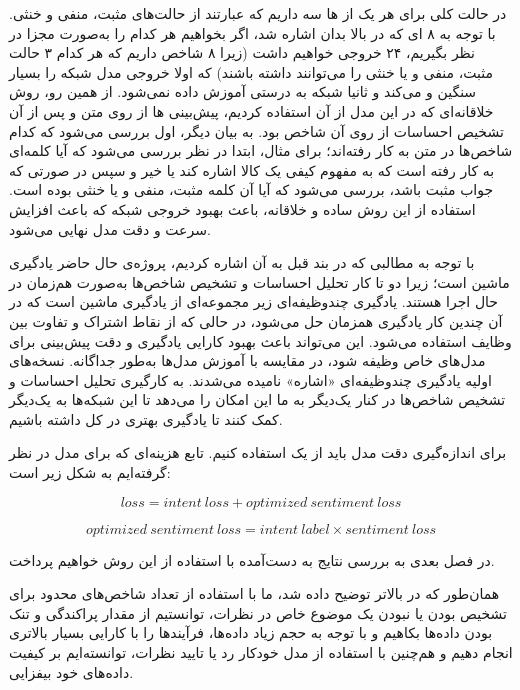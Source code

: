 در حالت کلی برای هر یک از 
ها 
سه
داریم که عبارتند از حالت‌های مثبت، منفی و خنثی. با توجه به ۸
ای که در بالا بدان اشاره شد، اگر بخواهیم هر کدام را به‌صورت مجزا در نظر بگیریم، ۲۴ خروجی خواهیم داشت (زیرا ۸ شاخص داریم که هر کدام ۳ حالت مثبت، منفی و یا خنثی را می‌توانند داشته باشند) که اولا خروجی مدل شبکه را بسیار سنگین و 
می‌کند و ثانیا شبکه به درستی آموزش داده نمی‌شود. از همین رو، روش خلاقانه‌ای که در این مدل از آن استفاده کردیم، پیش‌بینی 
ها از روی متن و پس از آن تشخیص احساسات از روی آن شاخص بود. 
 به بیان دیگر، اول بررسی می‌شود که کدام شاخص‌ها در متن به کار رفته‌اند؛ برای مثال، ابتدا در نظر بررسی می‌شود که آیا کلمه‌ای به کار رفته است که به مفهوم کیفی یک کالا اشاره کند یا خیر و سپس در صورتی که جواب مثبت باشد، بررسی می‌شود که آیا آن کلمه مثبت، منفی و یا خنثی بوده است. استفاده از این روش ساده و خلاقانه، باعث بهبود خروجی شبکه که باعث افزایش سرعت و دقت مدل نهایی می‌شود.

با توجه به مطالبی که در بند قبل به آن اشاره کردیم، پروژه‌ی حال حاضر 
یادگیری ماشین 
است؛ زیرا دو تا کار تحلیل احساسات و تشخیص شاخص‌ها به‌صورت هم‌زمان در حال اجرا هستند. یادگیری چندوظیفه‌ای زیر مجموعه‌ای از یادگیری ماشین است که در آن چندین کار یادگیری همزمان حل می‌شود، در حالی که از نقاط اشتراک و تفاوت بین وظایف استفاده می‌شود. این می‌تواند باعث بهبود کارایی یادگیری و دقت پیش‌بینی برای مدل‌های خاص وظیفه شود، در مقایسه با آموزش مدل‌ها به‌طور جداگانه. نسخه‌های اولیه یادگیری چندوظیفه‌ای «اشاره» نامیده می‌شدند.
\cite{wiki1}
\cite{wiki2}
\cite{wiki3}
به کارگیری تحلیل احساسات و تشخیص شاخص‌ها در کنار یک‌دیگر به ما این امکان را می‌دهد تا این شبکه‌ها به یک‌دیگر کمک کنند تا یادگیری بهتری در کل داشته باشیم.

برای اندازه‌گیری دقت مدل باید از یک 
استفاده کنیم. تابع هزینه‌ای که برای مدل در نظر گرفته‌ایم به شکل زیر است:

\begin{equation}
loss = intent \: loss + optimized \: sentiment \: loss
\end{equation}

\begin{equation}
optimized \: sentiment \:loss = intent \: label \times sentiment \: loss
\end{equation}

در فصل بعدی به بررسی نتایج به دست‌آمده با استفاده از این روش خواهیم پرداخت.

همان‌طور که در بالاتر توضیح داده شد، ما با استفاده از تعداد شاخص‌های محدود برای تشخیص بودن یا نبودن یک موضوع خاص در نظرات، توانستیم از مقدار پراکندگی و تنک بودن داده‌ها بکاهیم و با توجه به حجم زیاد داده‌ها، فرآیندها را با کارایی بسیار بالاتری انجام دهیم و هم‌چنین با استفاده از مدل خودکار رد یا تایید نظرات، توانسته‌ایم بر کیفیت داده‌های خود بیفزایی.